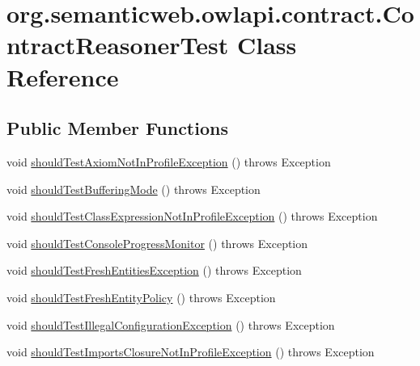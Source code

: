 \hypertarget{classorg_1_1semanticweb_1_1owlapi_1_1contract_1_1_contract_reasoner_test}{\section{org.\-semanticweb.\-owlapi.\-contract.\-Contract\-Reasoner\-Test Class Reference}
\label{classorg_1_1semanticweb_1_1owlapi_1_1contract_1_1_contract_reasoner_test}
}
\subsection*{Public Member Functions}
\begin{DoxyCompactItemize}
\item 
void \hyperlink{classorg_1_1semanticweb_1_1owlapi_1_1contract_1_1_contract_reasoner_test_aba8a06f223e4085bc8169d515ccd079e}{should\-Test\-Axiom\-Not\-In\-Profile\-Exception} ()  throws Exception 
\item 
void \hyperlink{classorg_1_1semanticweb_1_1owlapi_1_1contract_1_1_contract_reasoner_test_aa890233b267447d722d5cfac8670ba3f}{should\-Test\-Buffering\-Mode} ()  throws Exception 
\item 
void \hyperlink{classorg_1_1semanticweb_1_1owlapi_1_1contract_1_1_contract_reasoner_test_a6d447d52298feb8d00803918b0fa8e35}{should\-Test\-Class\-Expression\-Not\-In\-Profile\-Exception} ()  throws Exception 
\item 
void \hyperlink{classorg_1_1semanticweb_1_1owlapi_1_1contract_1_1_contract_reasoner_test_ad66da176fd21ed849c784924246fa591}{should\-Test\-Console\-Progress\-Monitor} ()  throws Exception 
\item 
void \hyperlink{classorg_1_1semanticweb_1_1owlapi_1_1contract_1_1_contract_reasoner_test_a3cbbed3d65ad170de0ae74b3aa48229f}{should\-Test\-Fresh\-Entities\-Exception} ()  throws Exception 
\item 
void \hyperlink{classorg_1_1semanticweb_1_1owlapi_1_1contract_1_1_contract_reasoner_test_af6bae76999cfddc76865b66963599f47}{should\-Test\-Fresh\-Entity\-Policy} ()  throws Exception 
\item 
void \hyperlink{classorg_1_1semanticweb_1_1owlapi_1_1contract_1_1_contract_reasoner_test_ac165134fa453c01f0678c5fa6317e9ea}{should\-Test\-Illegal\-Configuration\-Exception} ()  throws Exception 
\item 
void \hyperlink{classorg_1_1semanticweb_1_1owlapi_1_1contract_1_1_contract_reasoner_test_a40d2099cf04758165466e1449f05c420}{should\-Test\-Imports\-Closure\-Not\-In\-Profile\-Exception} ()  throws Exception 

\end{DoxyCompactItemize}
